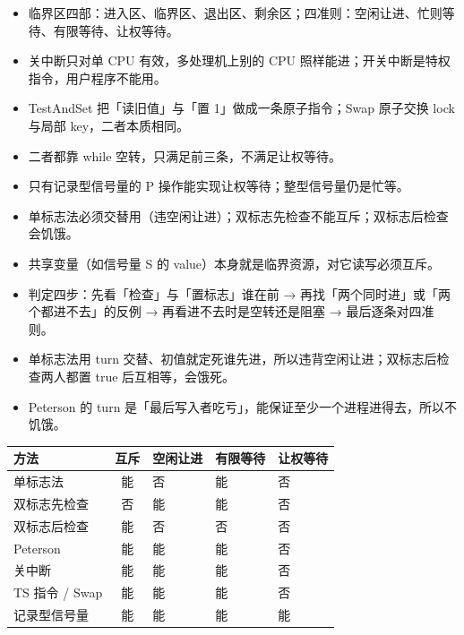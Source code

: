 \documentclass[10pt,a4paper]{ctexart}
\begin{document}
\begin{itemize}

\item 临界区四部：进入区、临界区、退出区、剩余区；四准则：空闲让进、忙则等待、有限等待、让权等待。

\item 关中断只对单 CPU 有效，多处理机上别的 CPU 照样能进；开关中断是特权指令，用户程序不能用。

\item TestAndSet 把「读旧值」与「置 1」做成一条原子指令；Swap 原子交换 lock 与局部 key，二者本质相同。

\item 二者都靠 while 空转，只满足前三条，不满足让权等待。

\item 只有记录型信号量的 P 操作能实现让权等待；整型信号量仍是忙等。

\item 单标志法必须交替用（违空闲让进）；双标志先检查不能互斥；双标志后检查会饥饿。

\item 共享变量（如信号量 S 的 value）本身就是临界资源，对它读写必须互斥。

\item 判定四步：先看「检查」与「置标志」谁在前 → 再找「两个同时进」或「两个都进不去」的反例 → 再看进不去时是空转还是阻塞 → 最后逐条对四准则。

\item 单标志法用 turn 交替、初值就定死谁先进，所以违背空闲让进；双标志后检查两人都置 true 后互相等，会饿死。

\item Peterson 的 turn 是「最后写入者吃亏」，能保证至少一个进程进得去，所以不饥饿。

\end{itemize}

\begin{center}\small
\begin{tabularx}{\linewidth}{@{}>{\raggedright\arraybackslash}Xclll@{}}
\toprule
方法 & 互斥 & 空闲让进 & 有限等待 & 让权等待 \\
\midrule
单标志法 & 能 & 否 & 能 & 否 \\
双标志先检查 & 否 & 能 & 能 & 否 \\
双标志后检查 & 能 & 否 & 否 & 否 \\
Peterson & 能 & 能 & 能 & 否 \\
关中断 & 能 & 能 & 能 & 否 \\
TS 指令 / Swap & 能 & 能 & 能 & 否 \\
记录型信号量 & 能 & 能 & 能 & 能 \\
\bottomrule
\end{tabularx}
\end{center}
\end{document}
